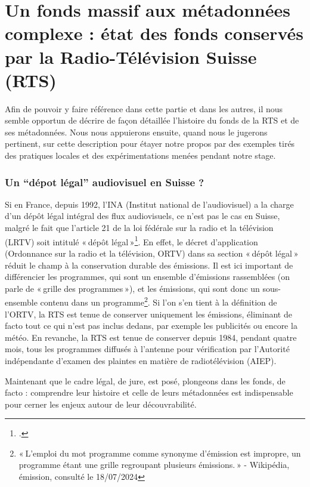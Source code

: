 \chapter{Un fonds massif aux métadonnées complexe : état des fonds conservés par la Radio-Télévision Suisse (RTS)}

Afin de pouvoir y faire référence dans cette partie et dans les autres, il nous semble opportun de décrire de façon détaillée l’histoire du fonds de la RTS et de ses métadonnées. Nous nous appuierons ensuite, quand nous le jugerons pertinent, sur cette description pour étayer notre propos par des exemples tirés des pratiques locales et des expérimentations menées pendant notre stage. 

\subsection{Un \enquote{dépot légal} audiovisuel en Suisse ?}


Si en France, depuis 1992, l’INA (Institut national de l’audiovisuel) a la charge d’un dépôt légal intégral des flux audiovisuels, ce n’est pas le cas en Suisse, malgré le fait que l’article 21 de la loi fédérale sur la radio et la télévision (LRTV) soit intitulé « dépôt légal »\footcite{zotero-260}. En effet, le décret d’application (Ordonnance sur la radio et la télévision, ORTV) dans sa section « dépôt légal » réduit le champ à la conservation durable des émissions. Il est ici important de différencier les programmes, qui sont un ensemble d’émissions rassemblées (on parle de « grille des programmes »), et les émissions, qui sont donc un sous-ensemble contenu dans un programme\footnote{« L'emploi du mot programme comme synonyme d'émission est impropre, un programme étant une grille regroupant plusieurs émissions. » - Wikipédia, émission, consulté le 18/07/2024}. Si l’on s’en tient à la définition de l’ORTV, la RTS est tenue de conserver uniquement les émissions, éliminant de facto tout ce qui n’est pas inclus dedans, par exemple les publicités ou encore la météo. En revanche, la RTS est tenue de conserver depuis 1984, pendant quatre mois, tous les programmes diffusés à l’antenne pour vérification par l’Autorité indépendante d’examen des plaintes en matière de radiotélévision (AIEP).

Maintenant que le cadre légal, de jure, est posé, plongeons dans les fonds, de facto : comprendre leur histoire et celle de leurs métadonnées est indispensable pour cerner les enjeux autour de leur découvrabilité.

